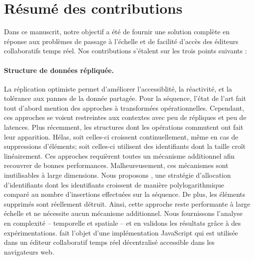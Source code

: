 
\section{Résumé des contributions}
\label{conclu:sec:summary}

Dans ce manuscrit, notre objectif a été de fournir une solution complète en
réponse aux problèmes de passage à l'échelle et de facilité d'accès des éditeurs
collaboratifs temps réel. Nos contributions s'étalent sur les trois points
suivants :

\paragraph{Structure de données répliquée.} La réplication optimiste permet
d'améliorer l'accessiblité, la réactivité, et la tolérance aux pannes de la
donnée partagée. Pour la séquence, l'état de l'art fait tout d'abord mention des
approches à transformées opérationnelles. Cependant, ces approches se voient
restreintes aux contextes avec peu de répliques et peu de latences. Plus
récemment, les structures dont les opérations commutent ont fait leur
apparition. Hélas, soit celles-ci croissent continuellement, même en cas de
suppressions d'éléments; soit celles-ci utilisent des identifiants dont la
taille croît linéairement. Ces approches requièrent toutes un mécanisme
additionnel afin recouvrer de bonnes performances. Malheureusement, ces
mécanismes sont inutilisables à large dimensions. Nous proposons \LSEQ, une
stratégie d'allocation d'identifiants dont les identifiants croissent de manière
polylogarithmique comparé au nombre d'insertions effectuées sur la séquence. De
plus, les éléments supprimés sont réellement détruit. Ainsi, cette approche
reste performante à large échelle et ne nécessite aucun mécanisme additionnel.
Nous fournissons l'analyse en complexité -- temporelle et spatiale -- et en
validons les résultats grâce à des expérimentations. \LSEQ fait l'objet d'une
implémentation JavaScript qui est utilisée dans un éditeur collaboratif temps
réel décentralisé accessible dans les navigateurs web.

